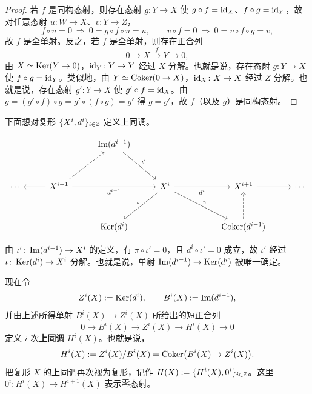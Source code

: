 \begin{proof}
若 $f$ 是同构态射，则存在态射 $g\colon Y\to X$ 使 $g\circ f=\mathrm{id}_X$、$f\circ g=\mathrm{id}_Y$，故对任意态射 $u\colon W\to X$、$v\colon Y\to Z$，
\[ f\circ u=0\ \Rightarrow\ 0=g\circ f\circ u=u,\qquad v\circ f=0\ \Rightarrow\ 0=v\circ f\circ g=v, \]
故 $f$ 是全单射。反之，若 $f$ 是全单射，则存在正合列
\[ 0\to X\xrightarrow{\ f\ }Y\to 0, \]
由 $X\simeq\operatorname{Ker}(Y\to 0)$，$\mathrm{id}_Y\colon Y\to Y$ 经过 $X$ 分解。也就是说，存在态射 $g\colon Y\to X$ 使 $f\circ g=\mathrm{id}_Y$。类似地，由 $Y\simeq\operatorname{Coker}(0\to X)$，$\mathrm{id}_X\colon X\to X$ 经过 $Z$ 分解。也就是说，存在态射 $g'\colon Y\to X$ 使 $g'\circ f=\mathrm{id}_X$。由 $g=(g'\circ f)\circ g=g'\circ(f\circ g)=g'$ 得 $g=g'$，故 $f$（以及 $g$）是同构态射。
\end{proof}

下面想对复形 $\{X^i,d^i\}_{i\in\mathbb{Z}}$ 定义上同调。

\[\begin{tikzcd}[row sep=3.2em, column sep=2.6em]
  & & \Img(d^{i-1}) \arrow[dr,"\iota'"] & & & & \\
  \cdots & X^{i-1} \arrow[l] \arrow[ur,dashed] \arrow[rr,"d^{i-1}"'] & & X^i \arrow[rr,"d^i"'] \arrow[dl,"\iota"'] \arrow[drr,"\pi"] & & X^{i+1} \arrow[r] & \cdots \\
  & & \Ker(d^i) & & & \Coker(d^{i-1}) \arrow[u,dashed] &
\end{tikzcd}\]

由 $\iota'\colon\operatorname{Im}(d^{i-1})\to X^i$ 的定义，有 $\pi\circ\iota'=0$，且 $d^i\circ\iota'=0$ 成立，故 $\iota'$ 经过 $\iota\colon\operatorname{Ker}(d^i)\to X^i$ 分解。也就是说，单射 $\operatorname{Im}(d^{i-1})\to\operatorname{Ker}(d^i)$ 被唯一确定。

现在令
\[ Z^i(X):=\operatorname{Ker}(d^i),\qquad B^i(X):=\operatorname{Im}(d^{i-1}), \]
并由上述所得单射 $B^i(X)\to Z^i(X)$ 所给出的短正合列
\begin{equation}
  0\to B^i(X)\to Z^i(X)\to H^i(X)\to 0 \tag{4.12}
\end{equation}
定义 $i$ 次\textbf{上同调} $H^i(X)$。也就是说，
\[ H^i(X):=Z^i(X)/B^i(X)=\operatorname{Coker}\bigl(B^i(X)\to Z^i(X)\bigr). \]
把复形 $X$ 的上同调再次视为复形，记作 $H(X):=\{H^i(X),0^i\}_{i\in\mathbb{Z}}$。这里 $0^i\colon H^i(X)\to H^{i+1}(X)$ 表示零态射。

